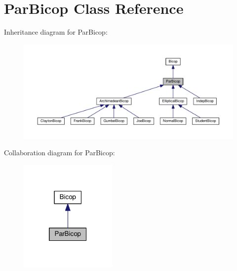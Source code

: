 \hypertarget{class_par_bicop}{\section{Par\+Bicop Class Reference}
\label{class_par_bicop}
}


Inheritance diagram for Par\+Bicop\+:
\nopagebreak
\begin{figure}[H]
\begin{center}
\leavevmode
\includegraphics[width=350pt]{class_par_bicop__inherit__graph}
\end{center}
\end{figure}


Collaboration diagram for Par\+Bicop\+:
\nopagebreak
\begin{figure}[H]
\begin{center}
\leavevmode
\includegraphics[width=134pt]{class_par_bicop__coll__graph}
\end{center}
\end{figure}

